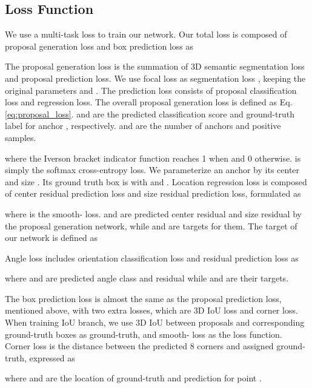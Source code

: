 \documentclass[10pt,twocolumn,letterpaper]{article}
\begin{document}
\subsection{Loss Function}
We use a multi-task loss to train our network. Our total loss is composed of proposal generation loss  and box prediction loss  as 

The proposal generation loss is the summation of 3D semantic segmentation loss and proposal prediction loss. We use focal loss \cite{FocalLoss} as segmentation loss , keeping the original parameters  and . The prediction loss consists of proposal classification loss and regression loss. The overall proposal generation loss is defined as Eq. \eqref{eq:proposal_loss}.  and  are the predicted classification score and ground-truth label for anchor , respectively.  and  are the number of anchors and positive samples.

where the Iverson bracket indicator function  reaches 1 when  and 0 otherwise.  is simply the softmax cross-entropy loss.
We parameterize an anchor  by its center  and size . Its ground truth box  is with  and .
Location regression loss is composed of center residual prediction loss and size residual prediction loss, formulated as

where  is the smooth- loss.  and  are predicted center residual and size residual by the proposal generation network, while  and  are targets for them. The target of our network is defined as

Angle loss includes orientation classification loss and residual prediction loss as

where  and  are predicted angle class and residual while  and  are their targets. 

The box prediction loss is almost the same as the proposal prediction loss, mentioned above, with two extra losses, which are 3D IoU loss and corner loss. When training IoU branch, we use 3D IoU between proposals and corresponding ground-truth boxes as ground-truth, and smooth- loss as the loss function. Corner loss is the distance between the predicted 8 corners and assigned ground-truth, expressed as

where  and  are the location of ground-truth and prediction for point .  
\end{document}
